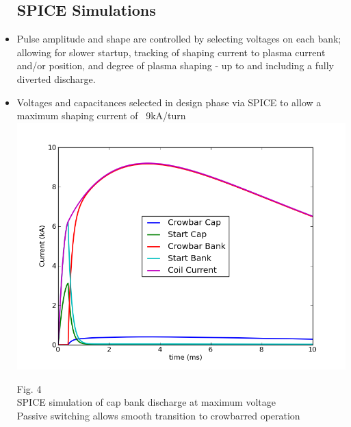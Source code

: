 \documentclass{article}
\begin{document}
\begin{multicols}{5}
\begin{itemize}
\subsection{SPICE Simulations}
\item Pulse amplitude and shape are controlled by selecting voltages on each bank; allowing for slower startup, tracking of shaping current to plasma current and/or position, and degree of plasma shaping - up to and including a fully diverted discharge.
\item Voltages and capacitances selected in design phase via SPICE to allow a maximum shaping current of ~9kA/turn\\
\vspace{.25in}
\includegraphics[width=0.9\columnwidth]{bank_currents.png}
\begin{center}
Fig. 4\\
SPICE simulation of cap bank discharge at maximum voltage\\
Passive switching allows smooth transition to crowbarred operation\\
\end{center}
\vspace{.25in}

\end{itemize}
\end{multicols}
\end{document}
